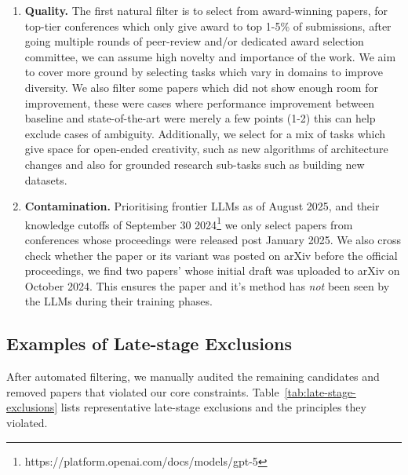 \documentclass[11pt]{article}
\theoremstyle{plain}
\theoremstyle{definition}
\theoremstyle{remark}
\begin{document}
\begin{enumerate}[label=\textbf{P\arabic*:}, leftmargin=1.5em]
\item \textbf{Quality.}
The first natural filter is to select from award-winning papers, for top-tier conferences which only give award to top 1-5\% of submissions, after going multiple rounds of peer-review and/or dedicated award selection committee, we can assume high novelty and importance of the work. We aim to cover more ground by selecting tasks which vary in domains to improve diversity. We also filter some papers which did not show enough room for improvement, these were cases where performance improvement between baseline and state-of-the-art were merely a few points (1-2) this can help exclude cases of ambiguity. Additionally, we select for a mix of tasks which give space for open-ended creativity, such as new algorithms of architecture changes and also for grounded research sub-tasks such as building new datasets.

\item \textbf{Contamination.}
Prioritising frontier LLMs as of August 2025, and their knowledge cutoffs of September 30 2024\footnote{https://platform.openai.com/docs/models/gpt-5} we only select papers from conferences whose proceedings were released post January 2025. We also cross check whether the paper or its variant was posted on arXiv before the official proceedings, we find two papers' whose initial draft was uploaded to arXiv on October 2024. This ensures the paper and it's method has \emph{not} been seen by the LLMs during their training phases.
\end{enumerate}

\subsection{Examples of Late-stage Exclusions} \label{app:late-stage-exclusions}
After automated filtering, we manually audited the remaining candidates and removed papers that violated our core constraints. Table~\ref{tab:late-stage-exclusions} lists representative late-stage exclusions and the principles they violated.
\end{document}
